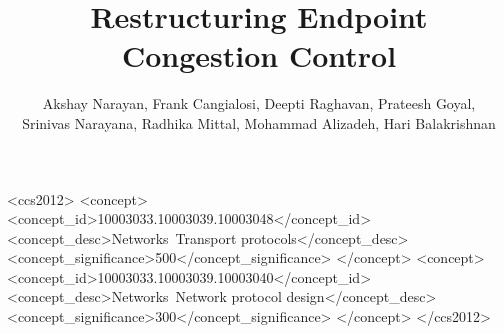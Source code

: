 \documentclass[format=sigconf,10pt,natbib=false]{acmart}
\begin{document}
\title{Restructuring Endpoint Congestion Control}
\author{
Akshay Narayan,
Frank Cangialosi,
Deepti Raghavan,
Prateesh Goyal,\\
Srinivas Narayana,
Radhika Mittal,
Mohammad Alizadeh,
Hari Balakrishnan
}
\begin{CCSXML}
<ccs2012>
<concept>
<concept_id>10003033.10003039.10003048</concept_id>
<concept_desc>Networks~Transport protocols</concept_desc>
<concept_significance>500</concept_significance>
</concept>
<concept>
<concept_id>10003033.10003039.10003040</concept_id>
<concept_desc>Networks~Network protocol design</concept_desc>
<concept_significance>300</concept_significance>
</concept>
</ccs2012>
\end{CCSXML}

\newcommand*{\origrightarrow}{$\rightarrow$}
\let\oldarrow\textrightarrow
\renewcommand*{\textrightarrow}{\fontfamily{cmr}\selectfont\origrightarrow}

\begin{sloppypar}

\maketitle












\end{sloppypar}
\end{document}
